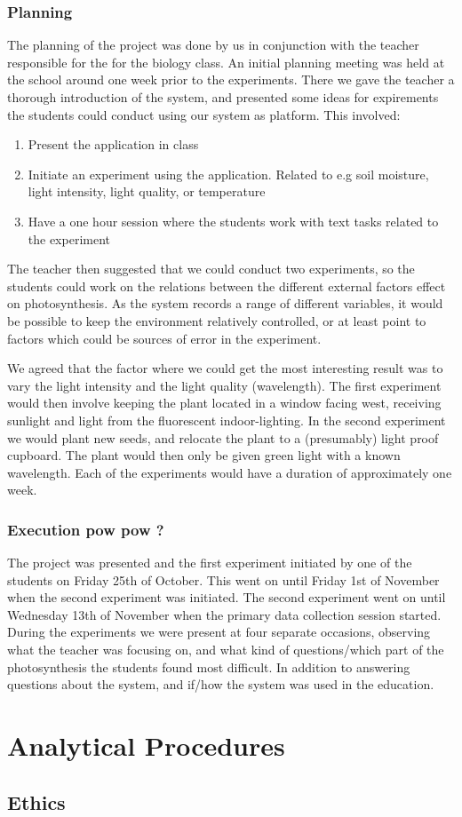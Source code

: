 \subsubsection{Planning}
The planning of the project was done by us in conjunction with the teacher responsible for the for the biology class. An initial planning meeting was held at the school around one week prior to the experiments. There we gave the teacher a thorough introduction of the system, and presented some ideas for expirements the students could conduct using our system as platform. This involved:

\begin{enumerate}
\item{Present the application in class}
\item{Initiate an experiment using the application. Related to e.g soil moisture, light intensity, light quality, or temperature}
\item{Have a one hour session where the students work with text tasks related to the experiment}
\end{enumerate}

The teacher then suggested that we could conduct two experiments, so the students could work on the relations between the different external factors effect on photosynthesis. As the system records a range of different variables, it would be possible to keep the environment relatively controlled, or at least point to factors which could be sources of error in the experiment. 

We agreed that the factor where we could get the most interesting result was to vary the light intensity and the light quality (wavelength). The first experiment would then involve keeping the plant located in a window facing west, receiving sunlight and light from the fluorescent indoor-lighting. In the second experiment we would plant new seeds, and relocate the plant to a (presumably) light proof cupboard. The plant would then only be given green light with a known wavelength. Each of the experiments would have a duration of approximately one week. 

\subsubsection{Execution pow pow ?}
The project was presented and the first experiment initiated by one of the students on Friday 25th of October. This went on until Friday 1st of November when the second experiment was initiated. The second experiment went on until Wednesday 13th of November when the primary data collection session started. During the experiments we were present at four separate occasions, observing what the teacher was focusing on, and what kind of questions/which part of the photosynthesis the students found most difficult. In addition to answering questions about the system, and if/how the system was used in the education. 



\section{Analytical Procedures}

\subsection{Ethics}



